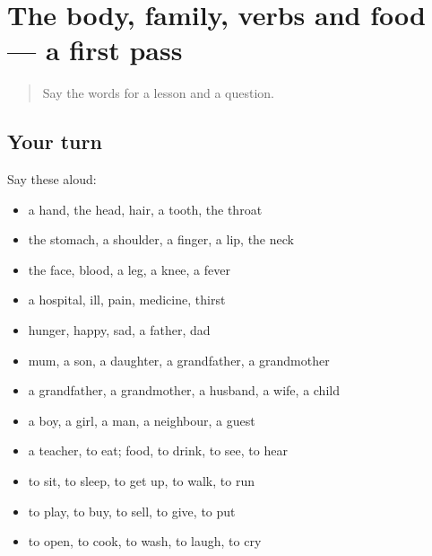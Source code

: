 \section[(dialogue)]{The body, family, verbs and food — a first pass}

\label{lesson:UR-R62-first-pass-the-body-family-verbs-and-food}



\begin{quote}
Say the words for a lesson and a question.
\end{quote}

\subsection*{Your turn}
Say these aloud:

\begin{itemize}
\raggedright
  \item a hand, the head, hair, a tooth, the throat
  \item the stomach, a shoulder, a finger, a lip, the neck
  \item the face, blood, a leg, a knee, a fever
  \item a hospital, ill, pain, medicine, thirst
  \item hunger, happy, sad, a father, dad
  \item mum, a son, a daughter, a grandfather, a grandmother
  \item a grandfather, a grandmother, a husband, a wife, a child
  \item a boy, a girl, a man, a neighbour, a guest
  \item a teacher, to eat; food, to drink, to see, to hear
  \item to sit, to sleep, to get up, to walk, to run
  \item to play, to buy, to sell, to give, to put
  \item to open, to cook, to wash, to laugh, to cry
\end{itemize}

